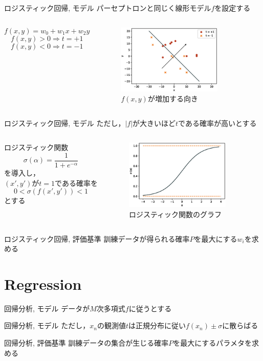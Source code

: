 \documentclass[dvipdfmx,platex]{beamer}
\begin{document}
\begin{frame}{ロジスティック回帰, モデル}
  パーセプトロンと同じく線形モデル$f$を設定する
  \begin{columns}[T,onlytextwidth]
    \[f(x,y)=w_0+w_1x+w_2y\]
    \[f(x,y)>0\Rightarrow t = +1\]
    \[f(x,y)<0\Rightarrow t = -1\]
    \begin{figure}
      \centering
      \includegraphics[width=5cm]{fig/direction.eps}
      \caption{$f(x,y)${\mgfamily が増加する向き}}
    \end{figure}
  \end{columns}
\end{frame}
\begin{frame}{ロジスティック回帰, モデル}
  ただし，$|f|$が大きいほど$t$である確率が高いとする
  \begin{columns}[T,onlytextwidth]
    ロジスティック関数
    \[\sigma\left(\alpha\right)=\frac{1}{1+e^{-\alpha}}\]
    を導入し，\\
    $(x',y')$が$t=1$である確率を\\
    \[0 < \sigma \left(f\left(x',y'\right)\right) < 1\]
    とする
    \begin{figure}
      \centering
      \includegraphics[width=5cm]{fig/sigmoid.eps}
      \caption{{\mgfamily ロジスティック関数のグラフ}}
    \end{figure}
  \end{columns}
\end{frame}
\begin{frame}{ロジスティック回帰, 評価基準}
  訓練データが得られる確率$P$を最大にする$w_i$を求める
\end{frame}
\section{Regression}
\begin{frame}{回帰分析, モデル}
  データが$M$次多項式$f$に従うとする
\end{frame}
\begin{frame}{回帰分析, モデル}
  ただし，$x_n$の観測値$t$は正規分布に従い$f(x_n)\pm\sigma$に散らばる  
\end{frame}
\begin{frame}{回帰分析, 評価基準}
  訓練データの集合が生じる確率$P$を最大にするパラメタを求める
\end{frame}
\end{document}
